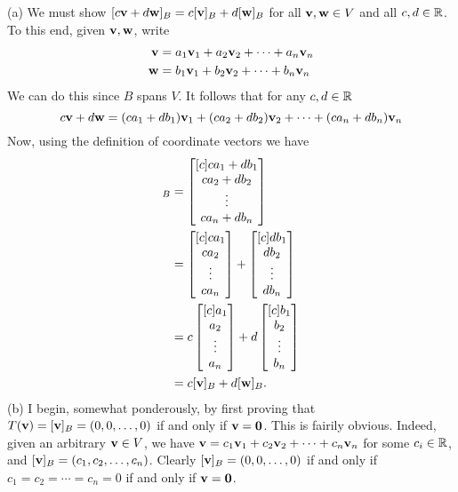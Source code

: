 \begin{solution}
\noindent (a) We must show $[c{\mathbf v}+d{\mathbf w}]_B=c[{\mathbf v}]_B+d[{\mathbf w}]_B$ for all ${\mathbf v},{\mathbf w}\in V$ and all $c,d\in{\mathbb R}$. 
To this end, given ${\mathbf v}, {\mathbf w}$, write
\begin{align*}
{\mathbf v}&=a_1{\mathbf v}_1+a_2{\mathbf v}_2+\cdots +a_n{\mathbf v}_n\\
{\mathbf w}&=b_1{\mathbf v}_1+b_2{\mathbf v}_2+\cdots +b_n{\mathbf v}_n
\end{align*} 
We can do this since $B$ spans $V$. It follows that for any $c,d\in{\mathbb R}$ 
\[
c{\mathbf v}+d{\mathbf w}=(ca_1+db_1){\mathbf v}_1+(ca_2+db_2){\mathbf v}_2+\cdots +(ca_n+db_n){\mathbf v}_n
\]
Now, using the definition of coordinate vectors we have 
\begin{align*}
[c\boldv+d\boldw]_B&=\colvec{ca_1+db_1\\ca_2+db_2\\ \vdots \\ ca_n+db_n}\\
&=\colvec{ca_1\\ca_2\\ \vdots \\ ca_n}+\colvec{db_1\\db_2\\ \vdots \\ db_n}\\
&=c\colvec{a_1\\a_2\\ \vdots \\ a_n}+d\colvec{b_1\\b_2\\ \vdots \\ b_n}\\
&=c[\boldv]_B+d[\boldw]_B.
\end{align*} 
(b) I begin, somewhat ponderously, by first proving that $T({\mathbf v})=[{\mathbf v}]_B=(0,0,\dots, 0)$ if and only if ${\mathbf v}={\mathbf 0}$. 
This is fairily obvious. Indeed, given an arbitrary ${\mathbf v}\in V$, we have ${\mathbf v}=c_1{\mathbf v}_1+c_2{\mathbf v}_2+\cdots +c_n{\mathbf v}_n$ for some $c_i\in {\mathbb R}$, and $[{\mathbf v}]_B=(c_1,c_2,\dots, c_n)$.  Clearly $[{\mathbf v}]_B=(0,0,\dots, 0)$ if and only if $c_1=c_2=\cdots =c_n=0$ if and only if ${\mathbf v}={\mathbf 0}$. 


\end{solution}
